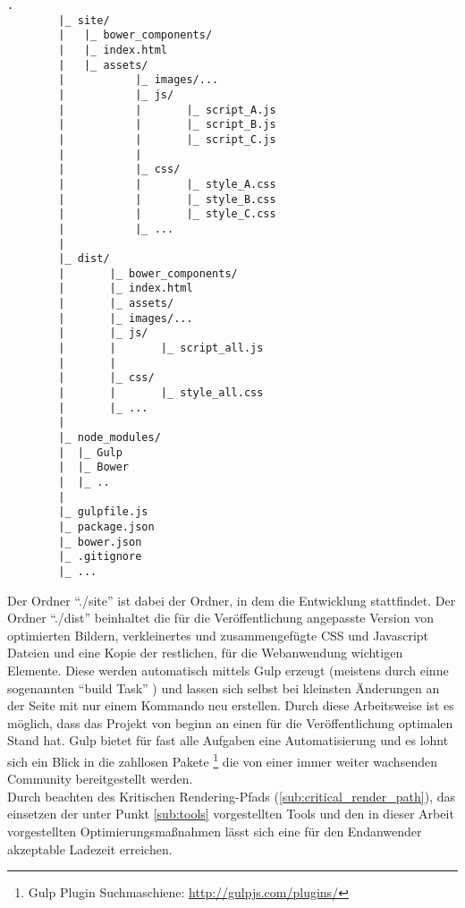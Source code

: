 		\begin{lstlisting}[captionpos=b, caption=Projektstruktur, label=lst:projectTree]
		.
		|_ site/
		|	|_ bower_components/
		|	|_ index.html
		|	|_ assets/
		|			|_ images/...
		|			|_ js/
		|			|		|_ script_A.js
		|			|		|_ script_B.js
		|			|		|_ script_C.js
		|			|
		|			|_ css/
		|			|		|_ style_A.css
		|			|		|_ style_B.css
		|			|		|_ style_C.css
		|			|_ ...
		|
		|_ dist/
		|		|_ bower_components/
		|		|_ index.html
		|		|_ assets/
		|		|_ images/...
		|		|_ js/
		|		|		|_ script_all.js
		|		|
		|		|_ css/
		|		|		|_ style_all.css
		|		|_ ...
		|
		|_ node_modules/
		|  |_ Gulp
		|  |_ Bower
		|  |_ ..
		|
		|_ gulpfile.js
		|_ package.json
		|_ bower.json
		|_ .gitignore
		|_ ...
		\end{lstlisting}

		Der Ordner "`./site"' ist dabei der Ordner, in dem die Entwicklung stattfindet. Der Ordner "`./dist"' beinhaltet die für die Veröffentlichung angepasste Version von optimierten Bildern, verkleinertes und zusammengefügte CSS und Javascript Dateien und eine Kopie der restlichen, für die Webanwendung wichtigen Elemente. Diese werden automatisch mittels Gulp erzeugt (meistens durch einne sogenannten "`build Task"' ) und lassen sich selbst bei kleinsten Änderungen an der Seite mit nur einem Kommando neu erstellen. Durch diese Arbeitsweise ist es möglich, dass das Projekt von beginn an einen für die Veröffentlichung optimalen Stand hat. Gulp bietet für fast alle Aufgaben eine Automatisierung und es lohnt sich ein Blick in die zahllosen Pakete \footnote{Gulp Plugin Suchmaschiene: \url{http://gulpjs.com/plugins/}} die von einer immer weiter wachsenden Community bereitgestellt werden.\\
		Durch beachten des Kritischen Rendering-Pfads (\ref{sub:critical_render_path}), das einsetzen der unter Punkt \ref{sub:tools} vorgestellten Tools und den in dieser Arbeit vorgestellten Optimierungsmaßnahmen lässt sich eine für den Endanwender akzeptable Ladezeit erreichen.


\pagebreak